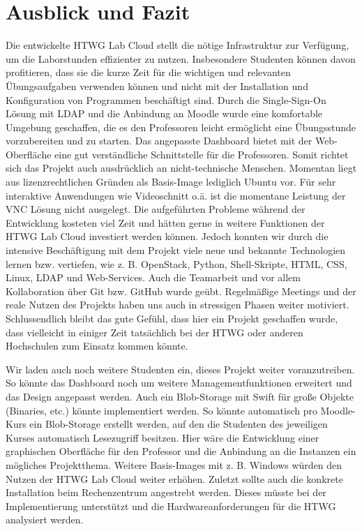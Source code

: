 \chapter{Ausblick und Fazit}

Die entwickelte HTWG Lab Cloud stellt die nötige Infrastruktur zur Verfügung, um die Laborstunden effizienter zu nutzen.
Insbesondere Studenten können davon profitieren, dass sie die kurze Zeit für die wichtigen und relevanten Übungsaufgaben verwenden können und nicht mit der Installation und Konfiguration von Programmen beschäftigt sind.
Durch die Single-Sign-On Lösung mit LDAP und die Anbindung an Moodle wurde eine komfortable Umgebung geschaffen, die es den Professoren leicht ermöglicht eine Übungsstunde vorzubereiten und zu starten.
Das angepasste Dashboard bietet mit der Web-Oberfläche eine gut verständliche Schnittstelle für die Professoren. 
Somit richtet sich das Projekt auch ausdrücklich an nicht-technische Menschen.
Momentan liegt aus lizenzrechtlichen Gründen als Basis-Image lediglich Ubuntu vor. 
Für sehr interaktive Anwendungen wie Videoschnitt o.ä. ist die momentane Leistung der VNC Lösung nicht ausgelegt. 
Die aufgeführten Probleme während der Entwicklung kosteten viel Zeit und hätten gerne in weitere Funktionen der HTWG Lab Cloud investiert werden können.
Jedoch konnten wir durch die intensive Beschäftigung mit dem Projekt viele neue und bekannte Technologien lernen bzw. vertiefen, wie z. B. OpenStack, Python, Shell-Skripte, HTML, CSS, Linux, LDAP und Web-Services.
Auch die Teamarbeit und vor allem Kollaboration über Git bzw. GitHub wurde geübt. 
Regelmäßige Meetings und der reale Nutzen des Projekts haben uns auch in stressigen Phasen weiter motiviert.
Schlussendlich bleibt das gute Gefühl, dass hier ein Projekt geschaffen wurde, dass vielleicht in einiger Zeit tatsächlich bei der HTWG oder anderen Hochschulen zum Einsatz kommen könnte.

Wir laden auch noch weitere Studenten ein, dieses Projekt weiter voranzutreiben. 
So könnte das Dashboard noch um weitere Managementfunktionen erweitert und das Design angepasst werden.
Auch ein Blob-Storage mit Swift für große Objekte (Binaries, etc.) könnte implementiert werden.
So könnte automatisch pro Moodle-Kurs ein Blob-Storage erstellt werden, auf den die Studenten des jeweiligen Kurses automatisch Lesezugriff besitzen.
Hier wäre die Entwicklung einer graphischen Oberfläche für den Professor und die Anbindung an die Instanzen ein mögliches Projektthema.
Weitere Basis-Images mit z. B. Windows würden den Nutzen der HTWG Lab Cloud weiter erhöhen.
Zuletzt sollte auch die konkrete Installation beim Rechenzentrum angestrebt werden.
Dieses müsste bei der Implementierung unterstützt und die Hardwareanforderungen für die HTWG analysiert werden.

